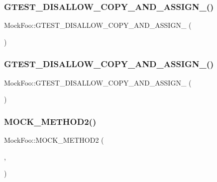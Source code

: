 \subsubsection{\texorpdfstring{GTEST\_DISALLOW\_COPY\_AND\_ASSIGN\_()}{GTEST\_DISALLOW\_COPY\_AND\_ASSIGN\_()}\hspace{0.1cm}{\footnotesize\ttfamily [2/3]}}
{\footnotesize\ttfamily Mock\+Foo\+::\+G\+T\+E\+S\+T\+\_\+\+D\+I\+S\+A\+L\+L\+O\+W\+\_\+\+C\+O\+P\+Y\+\_\+\+A\+N\+D\+\_\+\+A\+S\+S\+I\+G\+N\+\_\+ (\begin{DoxyParamCaption}\item[{\mbox{\hyperlink{class_mock_foo}{Mock\+Foo}}}]{ }\end{DoxyParamCaption})\hspace{0.3cm}{\ttfamily [private]}}

\mbox{\label{class_mock_foo_a2919ec5552ea98597059750e7533a76c}} 
\subsubsection{\texorpdfstring{GTEST\_DISALLOW\_COPY\_AND\_ASSIGN\_()}{GTEST\_DISALLOW\_COPY\_AND\_ASSIGN\_()}\hspace{0.1cm}{\footnotesize\ttfamily [3/3]}}
{\footnotesize\ttfamily Mock\+Foo\+::\+G\+T\+E\+S\+T\+\_\+\+D\+I\+S\+A\+L\+L\+O\+W\+\_\+\+C\+O\+P\+Y\+\_\+\+A\+N\+D\+\_\+\+A\+S\+S\+I\+G\+N\+\_\+ (\begin{DoxyParamCaption}\item[{\mbox{\hyperlink{class_mock_foo}{Mock\+Foo}}}]{ }\end{DoxyParamCaption})\hspace{0.3cm}{\ttfamily [private]}}

\mbox{\label{class_mock_foo_ae1d53263d5efcf38fda3990302fac6ab}} 
\subsubsection{\texorpdfstring{MOCK\_METHOD2()}{MOCK\_METHOD2()}\hspace{0.1cm}{\footnotesize\ttfamily [1/6]}}
{\footnotesize\ttfamily Mock\+Foo\+::\+M\+O\+C\+K\+\_\+\+M\+E\+T\+H\+O\+D2 (\begin{DoxyParamCaption}\item[{Bar2}]{,  }\item[{bool(int \mbox{\hyperlink{_obj__test_2lib_2googletest-master_2googlemock_2test_2gmock-matchers__test_8cc_a6150e0515f7202e2fb518f7206ed97dc}{x}}, int \mbox{\hyperlink{_obj__test_2lib_2googletest-master_2googlemock_2test_2gmock-matchers__test_8cc_a39cb44155237f0205e0feb931d5acbed}{y}})}]{ }\end{DoxyParamCaption})}

